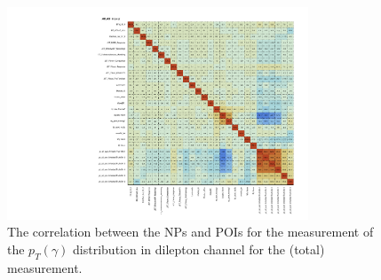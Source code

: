 \begin{figure}[ht]
  \centering
  \includegraphics[width=0.8\textwidth]{figures/diff_xsec/dilep_tty_total_mu_blinded/correlations/tty2l_pt_all_syst/CorrMatrix.pdf}
  \caption{The correlation between the NPs and POIs for the measurement of 
  the $p_T(\gamma)$ distribution in dilepton channel for the \tty(total) measurement.}
  \label{fig:NP-corr_dilep_mu_blinded_tty_total}
\end{figure}
\FloatBarrier


